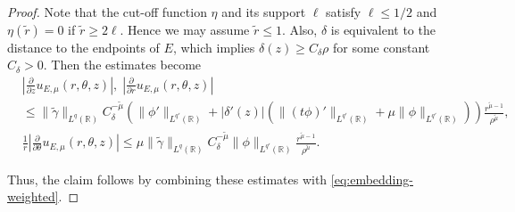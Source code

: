 ﻿\documentclass[11pt,reqno,oneside]{amsart}
\theoremstyle{definition}
\theoremstyle{remark}
\newcommand{\R}{\mathbb{R}}
\renewcommand{\d}{\delta}
\newcommand{\g}{\gamma}
\renewcommand{\t}{\theta}
\newcommand{\p}{\partial}
\begin{document}
\begin{proof}
            Note that the cut-off function $\eta$ and its support $\ell$ satisfy $\ell \leq 1/2$ and $\eta(\widetilde{r})=0$ if $\widetilde{r}\geq 2\ell$. Hence we may assume $\widetilde{r}\leq 1$. Also, $\d$ is equivalent to the distance to the endpoints of $E$, which implies $\d(z)\geq C_{\d}\rho$ for some constant $C_\d>0$. Then the estimates become
            \begin{align*}
                &\left|\frac{\p}{\p z} u_{E,\mu}(r,\t,z)\right|,\; \left|\frac{\p}{\p r} u_{E,\mu}(r,\t,z)\right|\\
                 &\leq \|\widetilde{\g}\|_{L^q(\R)} C_\d^{-\widetilde{\mu}}\left( \|\phi'\|_{L^{q'}(\R)} + |\d'(z)|(\|(t\phi)'\|_{L^{q'}(\R)}+\mu \|\phi\|_{L^{q'}(\R)})\right)\frac{r^{\widetilde{\mu}-1}}{\rho^{\widetilde{\mu}}},\\
                 & \frac{1}{r} \left|\frac{\p}{\p \t} u_{E,\mu}(r,\t,z)\right| \leq \mu\|\widetilde{\g}\|_{L^q(\R)} C_\d^{-\widetilde{\mu}} \|\phi\|_{L^{q'}(\R)}\frac{r^{\widetilde{\mu}-1}}{\rho^{\widetilde{\mu}}}.
            \end{align*}            
            
            Thus, the claim follows by combining these estimates with \eqref{eq:embedding-weighted}.
        \end{proof}

        \medskip
\end{document}
